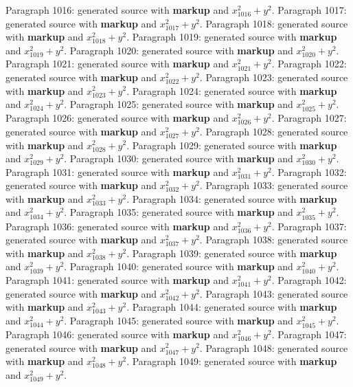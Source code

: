 \documentclass{article}
\begin{document}
Paragraph 1016: generated source with \textbf{markup} and $x_{1016}^2 + y^2$.
Paragraph 1017: generated source with \textbf{markup} and $x_{1017}^2 + y^2$.
Paragraph 1018: generated source with \textbf{markup} and $x_{1018}^2 + y^2$.
Paragraph 1019: generated source with \textbf{markup} and $x_{1019}^2 + y^2$.
Paragraph 1020: generated source with \textbf{markup} and $x_{1020}^2 + y^2$.
Paragraph 1021: generated source with \textbf{markup} and $x_{1021}^2 + y^2$.
Paragraph 1022: generated source with \textbf{markup} and $x_{1022}^2 + y^2$.
Paragraph 1023: generated source with \textbf{markup} and $x_{1023}^2 + y^2$.
Paragraph 1024: generated source with \textbf{markup} and $x_{1024}^2 + y^2$.
Paragraph 1025: generated source with \textbf{markup} and $x_{1025}^2 + y^2$.
Paragraph 1026: generated source with \textbf{markup} and $x_{1026}^2 + y^2$.
Paragraph 1027: generated source with \textbf{markup} and $x_{1027}^2 + y^2$.
Paragraph 1028: generated source with \textbf{markup} and $x_{1028}^2 + y^2$.
Paragraph 1029: generated source with \textbf{markup} and $x_{1029}^2 + y^2$.
Paragraph 1030: generated source with \textbf{markup} and $x_{1030}^2 + y^2$.
Paragraph 1031: generated source with \textbf{markup} and $x_{1031}^2 + y^2$.
Paragraph 1032: generated source with \textbf{markup} and $x_{1032}^2 + y^2$.
Paragraph 1033: generated source with \textbf{markup} and $x_{1033}^2 + y^2$.
Paragraph 1034: generated source with \textbf{markup} and $x_{1034}^2 + y^2$.
Paragraph 1035: generated source with \textbf{markup} and $x_{1035}^2 + y^2$.
Paragraph 1036: generated source with \textbf{markup} and $x_{1036}^2 + y^2$.
Paragraph 1037: generated source with \textbf{markup} and $x_{1037}^2 + y^2$.
Paragraph 1038: generated source with \textbf{markup} and $x_{1038}^2 + y^2$.
Paragraph 1039: generated source with \textbf{markup} and $x_{1039}^2 + y^2$.
Paragraph 1040: generated source with \textbf{markup} and $x_{1040}^2 + y^2$.
Paragraph 1041: generated source with \textbf{markup} and $x_{1041}^2 + y^2$.
Paragraph 1042: generated source with \textbf{markup} and $x_{1042}^2 + y^2$.
Paragraph 1043: generated source with \textbf{markup} and $x_{1043}^2 + y^2$.
Paragraph 1044: generated source with \textbf{markup} and $x_{1044}^2 + y^2$.
Paragraph 1045: generated source with \textbf{markup} and $x_{1045}^2 + y^2$.
Paragraph 1046: generated source with \textbf{markup} and $x_{1046}^2 + y^2$.
Paragraph 1047: generated source with \textbf{markup} and $x_{1047}^2 + y^2$.
Paragraph 1048: generated source with \textbf{markup} and $x_{1048}^2 + y^2$.
Paragraph 1049: generated source with \textbf{markup} and $x_{1049}^2 + y^2$.
\end{document}
